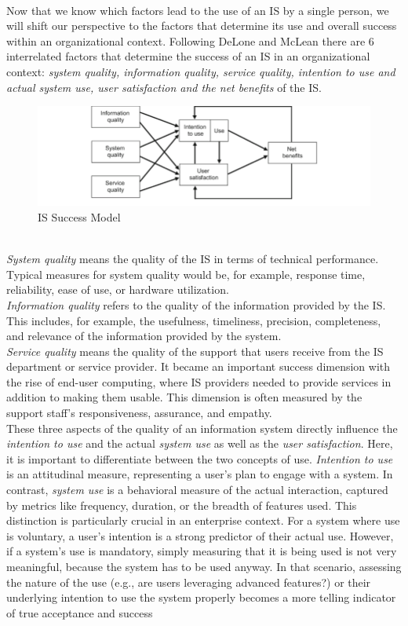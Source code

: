 \documentclass[
	english,
	ruledheaders=section,%
	class=report,%
	thesis={type=bachelor},%
	accentcolor=1b,%
	custommargins=true,%
	marginpar=false,%
	parskip=half-,%
	fontsize=11pt,%
	DIV=14,
]{tudapub}
\begin{document}
\\
Now that we know which factors lead to the use of an IS by a single person, we will shift our perspective to the factors that determine its use and overall success within an organizational context.
Following DeLone and McLean \parencite{DeloneMcLean2003ISSuccessTenYearUpdate} there are 6 interrelated factors that determine the success of an IS in an organizational context: \textit{system quality, information quality, service quality, intention to use and actual system use, user satisfaction and the net benefits} of the IS.\\
\begin{figure}[h!]
    \includegraphics[width=1\linewidth]{images/ISSuccess.png}
    \caption{IS Success Model}
    \label{fig:enter-label}
\end{figure}
\\
\textit{System quality} means the quality of the IS in terms of technical performance. Typical measures for system quality would be, for example, response time, reliability, ease of use, or hardware utilization.\\
\textit{Information quality} refers to the quality of the information provided by the IS. This includes, for example, the usefulness, timeliness, precision, completeness, and relevance of the information provided by the system.\\
\textit{Service quality} means the quality of the support that users receive from the IS department or service provider. It became an important success dimension with the rise of end-user computing, where IS providers needed to provide services in addition to making them usable. This dimension is often measured by the support staff's responsiveness, assurance, and empathy.
\\
These three aspects of the quality of an information system directly influence the \textit{intention to use} and the actual \textit{system use} as well as the \textit{user satisfaction}. Here, it is important to differentiate between the two concepts of use. \textit{Intention to use} is an attitudinal measure, representing a user's plan to engage with a system. In contrast, \textit{system use} is a behavioral measure of the actual interaction, captured by metrics like frequency, duration, or the breadth of features used. This distinction is particularly crucial in an enterprise context. For a system where use is voluntary, a user's intention is a strong predictor of their actual use. However, if a system's use is mandatory, simply measuring that it is being used is not very meaningful, because the system has to be used anyway. In that scenario, assessing the nature of the use (e.g., are users leveraging advanced features?) or their underlying intention to use the system properly becomes a more telling indicator of true acceptance and success
\end{document}
